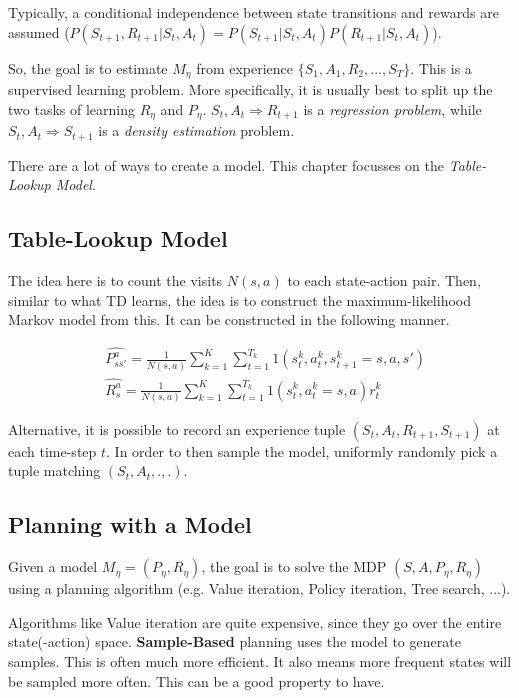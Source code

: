 Typically, a conditional independence between state transitions and rewards are assumed ($P(S_{t+1}, R_{t+1} | S_t, A_t) = P(S_{t+1} | S_t, A_t)P(R_{t+1} | S_t, A_t)$).

So, the goal is to estimate $M_\eta$ from experience $\{S_1, A_1, R_2, ..., S_T\}$. This is a supervised learning problem. More specifically, it is usually best to split up the two tasks of learning $R_\eta$ and $P_\eta$. $S_t, A_t \Rightarrow R_{t+1}$ is a \textit{regression problem}, while $S_t, A_t \Rightarrow S_{t+1}$ is a \textit{density estimation} problem.

There are a lot of ways to create a model. This chapter focusses on the \textit{Table-Lookup Model}. 

\subsection{Table-Lookup Model}

The idea here is to count the visits $N(s, a)$ to each state-action pair. Then, similar to what TD learns, the idea is to construct the maximum-likelihood Markov model from this. It can be constructed in the following manner.

\begin{equation}
	\begin{aligned}
		& \hat{P^a_{ss'}} = \frac{1}{N(s,a)} \sum_{k = 1}^K \sum_{t = 1}^{T_k} 1(s^k_t, a^k_t, s^k_{t+1} = s, a, s')\\
		& \hat{R^a_{s}} = \frac{1}{N(s,a)} \sum_{k = 1}^K \sum_{t = 1}^{T_k} 1(s^k_t, a^k_t = s, a)r^k_t
	\end{aligned}
	\label{eq:sampling-from-model}
\end{equation}

Alternative, it is possible to record an experience tuple $(S_t, A_t, R_{t+1}, S_{t+1})$ at each time-step $t$. In order to then sample the model, uniformly randomly pick a tuple matching $(S_t, A_t, ., .)$.

\subsection{Planning with a Model}

Given a model $M_\eta = (P_\eta, R_\eta)$, the goal is to solve the MDP $(S, A, P_\eta, R_\eta)$ using a planning algorithm (e.g. Value iteration, Policy iteration, Tree search, ...).

Algorithms like Value iteration are quite expensive, since they go over the entire state(-action) space. \textbf{Sample-Based} planning uses the model to generate samples. This is often much more efficient. It also means more frequent states will be sampled more often. This can be a good property to have.

